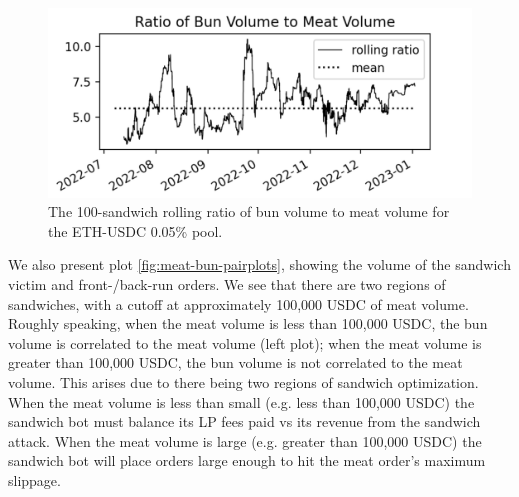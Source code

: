 
        \begin{figure}
            \label{fig:meat-bun-ratio}
            \centering
            \includegraphics[scale=.4]{figs/bun-to-meat-ratio.png}
            \caption{The 100-sandwich rolling ratio of bun volume to meat volume for the ETH-USDC 0.05\% pool.}
        \end{figure}

        We also present plot \ref{fig:meat-bun-pairplots}, showing the volume of the sandwich victim and front-/back-run orders. We see that there are two regions of sandwiches, with a cutoff at approximately 100,000 USDC of meat volume. Roughly speaking, when the meat volume is less than 100,000 USDC, the bun volume is correlated to the meat volume (left plot); when the meat volume is greater than 100,000 USDC, the bun volume is not correlated to the meat volume. This arises due to there being two regions of sandwich optimization. When the meat volume is less than small (e.g. less than 100,000 USDC) the sandwich bot must balance its LP fees paid vs its revenue from the sandwich attack. When the meat volume is large (e.g. greater than 100,000 USDC) the sandwich bot will place orders large enough to hit the meat order's maximum slippage.

